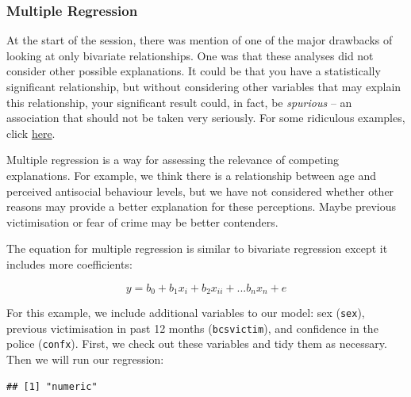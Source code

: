 \documentclass[
]{book}
\newenvironment{Shaded}{\begin{snugshade}}{\end{snugshade}}
\newcommand{\CommentTok}[1]{\textcolor[rgb]{0.56,0.35,0.01}{\textit{#1}}}
\newcommand{\FunctionTok}[1]{\textcolor[rgb]{0.00,0.00,0.00}{#1}}
\newcommand{\NormalTok}[1]{#1}
\newcommand{\SpecialCharTok}[1]{\textcolor[rgb]{0.00,0.00,0.00}{#1}}
\begin{document}
\hypertarget{multiple-regression}{%
\subsubsection{Multiple Regression}\label{multiple-regression}}

At the start of the session, there was mention of one of the major drawbacks of looking at only bivariate relationships. One was that these analyses did not consider other possible explanations. It could be that you have a statistically significant relationship, but without considering other variables that may explain this relationship, your significant result could, in fact, be \emph{spurious} -- an association that should not be taken very seriously. For some ridiculous examples, click \href{http://tylervigen.com/spurious-correlations}{here}.

Multiple regression is a way for assessing the relevance of competing explanations. For example, we think there is a relationship between age and perceived antisocial behaviour levels, but we have not considered whether other reasons may provide a better explanation for these perceptions. Maybe previous victimisation or fear of crime may be better contenders.

The equation for multiple regression is similar to bivariate regression except it includes more coefficients:

\[y = b_0 + b_1x_i + b_2x_{ii} +... b_nx_n + e\]

For this example, we include additional variables to our model: sex (\texttt{sex}), previous victimisation in past 12 months (\texttt{bcsvictim}), and confidence in the police (\texttt{confx}). First, we check out these variables and tidy them as necessary. Then we will run our regression:

\begin{Shaded}
\end{Shaded}

\begin{verbatim}
## [1] "numeric"
\end{verbatim}

\begin{Shaded}
\end{Shaded}
\end{document}
